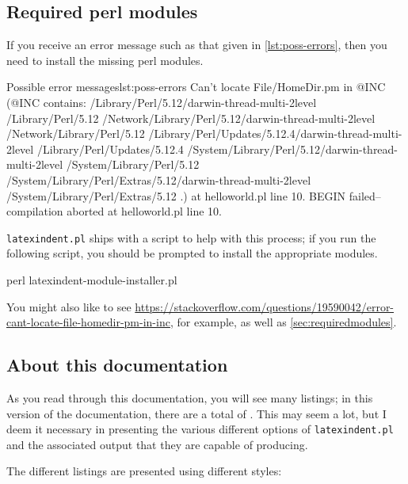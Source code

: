 \subsection{Required perl modules}
 If you receive an error message such as that given in
 \cref{lst:poss-errors}, then you need to install the missing perl modules.
 \begin{cmhlistings}[style=tcblatex,language=Perl]{Possible error messages}{lst:poss-errors}
Can't locate File/HomeDir.pm in @INC (@INC contains: /Library/Perl/5.12/darwin-thread-multi-2level /Library/Perl/5.12 /Network/Library/Perl/5.12/darwin-thread-multi-2level /Network/Library/Perl/5.12 /Library/Perl/Updates/5.12.4/darwin-thread-multi-2level /Library/Perl/Updates/5.12.4 /System/Library/Perl/5.12/darwin-thread-multi-2level /System/Library/Perl/5.12 /System/Library/Perl/Extras/5.12/darwin-thread-multi-2level /System/Library/Perl/Extras/5.12 .) at helloworld.pl line 10.
BEGIN failed--compilation aborted at helloworld.pl line 10.
\end{cmhlistings}
 \texttt{latexindent.pl} ships with a script to help with this process; if you run the
 following script, you should be prompted to install the appropriate modules.

 \begin{commandshell}
perl latexindent-module-installer.pl
\end{commandshell}

 You might also like to see
 \href{https://stackoverflow.com/questions/19590042/error-cant-locate-file-homedir-pm-in-inc}{https://stackoverflow.com/questions/19590042/error-cant-locate-file-homedir-pm-in-inc},
 for example, as well as \vref{sec:requiredmodules}.

\subsection{About this documentation}
 As you read through this documentation, you will see many listings; in this version of
 the documentation, there are a total of \totallstlistings. This may seem a lot, but I
 deem it necessary in presenting the various different options of \texttt{latexindent.pl}
 and the associated output that they are capable of producing.

 The different listings are presented using different styles:

